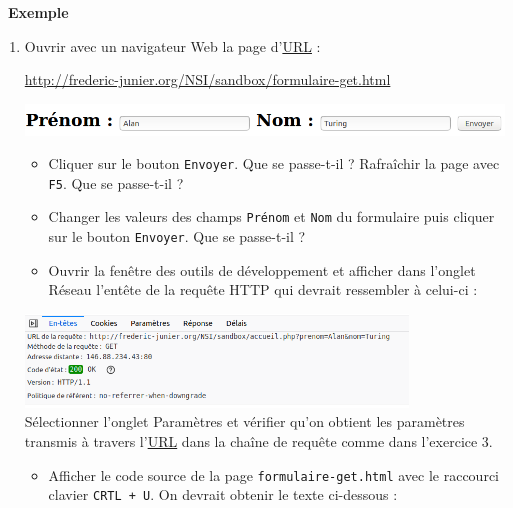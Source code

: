 \documentclass[
  11pt,
]{article}
\newcommand{\passthrough}[1]{#1}
\providecommand{\tightlist}{%
  \setlength{\itemsep}{0pt}\setlength{\parskip}{0pt}}
\newcounter{def}
\newcounter{exple}
\newenvironment{exemple}[1]
{\par \medskip   \addtocounter{exple}{1} \noindent  
\begin{bclogo}[arrondi =0.1,   noborder = true, logo=\bclampe, marge=4]{~\textbf{Exemple} \textbf{\theexple} {\itshape #1} }  \par}
{
\end{bclogo}
 \par \bigskip }
\begin{document}
\begin{exemple}{}

\begin{enumerate}
\def\labelenumi{\arabic{enumi}.}
\item
  Ouvrir avec un navigateur Web la page
  d'\href{https://developer.mozilla.org/fr/docs/Glossaire/URL}{URL} :

  \url{http://frederic-junier.org/NSI/sandbox/formulaire-get.html}

  \includegraphics{images/formulaire1.png}\\

  \begin{itemize}
  \tightlist
  \item
    Cliquer sur le bouton \passthrough{\lstinline!Envoyer!}. Que se
    passe-t-il ? Rafraîchir la page avec \passthrough{\lstinline!F5!}.
    Que se passe-t-il ?
  \item
    Changer les valeurs des champs \passthrough{\lstinline!Prénom!} et
    \passthrough{\lstinline!Nom!} du formulaire puis cliquer sur le
    bouton \passthrough{\lstinline!Envoyer!}. Que se passe-t-il ?
  \item
    Ouvrir la fenêtre des outils de développement et afficher dans
    l'onglet Réseau l'entête de la requête HTTP qui devrait ressembler à
    celui-ci :
  \end{itemize}

  \includegraphics[width=0.8\textwidth,height=\textheight]{images/entete-get.png}\\

  Sélectionner l'onglet Paramètres et vérifier qu'on obtient les
  paramètres transmis à travers
  l'\href{https://developer.mozilla.org/fr/docs/Glossaire/URL}{URL} dans
  la chaîne de requête comme dans l'exercice 3.

  \begin{itemize}
  \tightlist
  \item
    Afficher le code source de la page
    \passthrough{\lstinline!formulaire-get.html!} avec le raccourci
    clavier \passthrough{\lstinline!CRTL + U!}. On devrait obtenir le
    texte ci-dessous :
  \end{itemize}


\end{enumerate}
\end{exemple}
\end{document}
